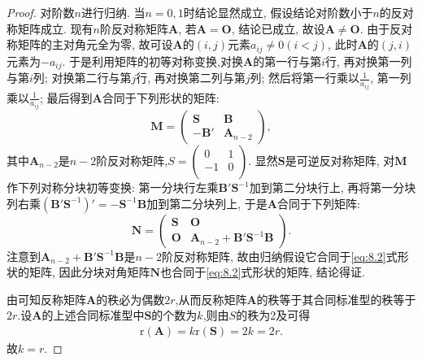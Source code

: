 \documentclass[../../main.tex]{subfiles}
\begin{document}
\begin{proof}
对阶数$n$进行归纳. 当$n = 0, 1$时结论显然成立, 假设结论对阶数小于$n$的反对称矩阵成立. 现有$n$阶反对称矩阵$\boldsymbol{A}$, 若$\boldsymbol{A}=\boldsymbol{O}$, 结论已成立, 故设$\boldsymbol{A}\neq\boldsymbol{O}$. 由于反对称矩阵的主对角元全为零, 故可设$\boldsymbol{A}$的$(i, j)$元素$a_{ij}\neq 0 (i < j)$, 此时$\boldsymbol{A}$的$(j, i)$元素为$-a_{ij}$. 于是利用矩阵的初等对称变换,对换$\boldsymbol{A}$的第一行与第$i$行, 再对换第一列与第$i$列; 对换第二行与第$j$行, 再对换第二列与第$j$列; 然后将第一行乘以$\frac{1}{a_{ij}}$, 第一列乘以$\frac{1}{a_{ij}}$; 最后得到$\boldsymbol{A}$合同于下列形状的矩阵:
\[
\boldsymbol{M}=\begin{pmatrix}
\boldsymbol{S} & \boldsymbol{B} \\
-\boldsymbol{B}' & \boldsymbol{A}_{n - 2}
\end{pmatrix},
\]
其中$\boldsymbol{A}_{n - 2}$是$n - 2$阶反对称矩阵,$S=\left( \begin{matrix}
0&		1\\
-1&		0\\
\end{matrix} \right) $. 显然$\boldsymbol{S}$是可逆反对称矩阵, 对$\boldsymbol{M}$作下列对称分块初等变换: 第一分块行左乘$\boldsymbol{B}'\boldsymbol{S}^{-1}$加到第二分块行上, 再将第一分块列右乘$(\boldsymbol{B}'\boldsymbol{S}^{-1})'=-\boldsymbol{S}^{-1}\boldsymbol{B}$加到第二分块列上, 于是$\boldsymbol{A}$合同于下列矩阵:
\[
\boldsymbol{N}=\begin{pmatrix}
\boldsymbol{S} & \boldsymbol{O} \\
\boldsymbol{O} & \boldsymbol{A}_{n - 2}+\boldsymbol{B}'\boldsymbol{S}^{-1}\boldsymbol{B}
\end{pmatrix}.
\]
注意到$\boldsymbol{A}_{n - 2}+\boldsymbol{B}'\boldsymbol{S}^{-1}\boldsymbol{B}$是$n - 2$阶反对称矩阵, 故由归纳假设它合同于\eqref{eq:8.2}式形状的矩阵, 因此分块对角矩阵$\boldsymbol{N}$也合同于\eqref{eq:8.2}式形状的矩阵, 结论得证.

由可知反称矩阵$\boldsymbol{A}$的秩必为偶数$2r$,从而反称矩阵$\boldsymbol{A}$的秩等于其合同标准型的秩等于$2r$.设$\boldsymbol{A}$的上述合同标准型中$\boldsymbol{S}$的个数为$k$,则由$S$的秩为2及可得
\begin{align*}
\mathrm{r}\left( \boldsymbol{A} \right) =k\mathrm{r}\left( \boldsymbol{S} \right) =2k=2r.
\end{align*}
故$k=r$.

\end{proof}
\end{document}
